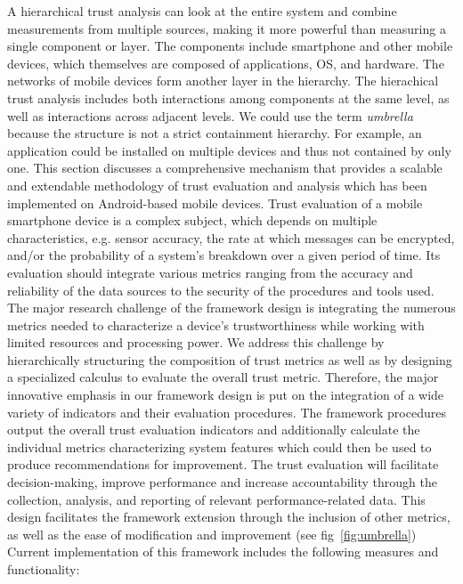 A hierarchical trust analysis can look at the entire system and combine measurements from multiple sources, making
it more powerful than measuring a single component or layer.  The components include smartphone and other mobile
devices, which themselves are composed of applications, OS, and hardware. The networks of mobile devices form another 
layer in the hierarchy.  The hierachical trust analysis includes both interactions among components at the same level,
as well as interactions across adjacent levels.  We could use the term {\it umbrella} because the structure is not
a strict containment hierarchy.  For example, an application could be installed on multiple devices and thus not
contained by only one.
This section discusses a comprehensive mechanism that provides a scalable and extendable methodology of trust
 evaluation and analysis which has been implemented on Android-based mobile devices.
Trust evaluation of a mobile smartphone device is a complex subject, which depends on multiple characteristics, 
e.g. sensor accuracy, the rate at which messages can be encrypted,  %
 and/or the probability of a system's breakdown over a given period of time. Its evaluation should integrate various 
 metrics ranging from the accuracy and reliability of the data sources to the security of the procedures and tools 
 used. The major research challenge of the framework design is integrating the numerous metrics needed to characterize
 a device's trustworthiness while working with limited resources and processing power. 
We address this challenge by hierarchically structuring the composition of trust metrics as well as by designing a specialized calculus to evaluate the overall trust metric. 
Therefore, the major innovative emphasis in our framework design is put on the integration of a wide variety of indicators and their evaluation procedures. The framework procedures output the overall trust evaluation indicators and additionally 
calculate the individual metrics characterizing system features which could then be used to produce recommendations for improvement. 
The trust evaluation will facilitate decision-making, improve performance and increase accountability through the collection, 
analysis, and reporting of relevant performance-related data. This design facilitates the framework extension through the 
inclusion of other metrics, as well as the ease of modification and improvement (see fig~\ref{fig:umbrella})
Current implementation of this framework includes the following measures and functionality: 

